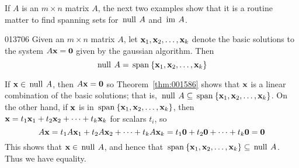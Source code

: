 If $A$ is an $m \times n$ matrix $A$, the next two examples show that it is a routine matter to find spanning sets for $\thinspace\operatorname{null\medspace} A$ and $\thinspace\operatorname{im\medspace} A$.

\begin{example}{}{013706}
Given an $m \times n$ matrix $A$, let $\textbf{x}_{1}, \textbf{x}_{2}, \dots, \textbf{x}_{k}$ denote the basic solutions to the system $A\textbf{x} = \textbf{0}$ given by the gaussian algorithm. Then
\begin{equation*}
\thinspace\operatorname{null \medspace} A = \thinspace\operatorname{span\medspace}\{\textbf{x}_1, \textbf{x}_2, \dots, \textbf{x}_k\}
\end{equation*}
\begin{solution}
If $\textbf{x} \in \thinspace\operatorname{null\medspace} A$, then $A\textbf{x} = \textbf{0}$ so Theorem~\ref{thm:001586} shows that $\textbf{x}$ is a linear combination of the basic solutions; that is, $\thinspace\operatorname{null\medspace} A \subseteq \thinspace\operatorname{span\medspace}\{\textbf{x}_{1}, \textbf{x}_{2}, \dots, \textbf{x}_{k}\}$. On the other hand, if $\textbf{x}$ is in $\thinspace\operatorname{span\medspace}\{\textbf{x}_{1}, \textbf{x}_{2}, \dots, \textbf{x}_{k}\}$, then $\textbf{x} = t_{1}\textbf{x}_{1} + t_{2}\textbf{x}_{2} + \dots + t_{k}\textbf{x}_{k}$ for scalars $t_{i}$, so
\begin{equation*}
A\textbf{x} = t_1A\textbf{x}_1 + t_2A\textbf{x}_2 + \dots +  t_kA\textbf{x}_k = t_1\textbf{0} + t_2\textbf{0} + \dots + t_k\textbf{0} = \textbf{0}
\end{equation*}
This shows that $\textbf{x} \in \thinspace\operatorname{null\medspace} A$, and hence that $\thinspace\operatorname{span\medspace}\{\textbf{x}_{1}, \textbf{x}_{2}, \dots, \textbf{x}_{k}\} \subseteq \thinspace\operatorname{null\medspace} A$. Thus we have equality.
\end{solution}
\end{example}

